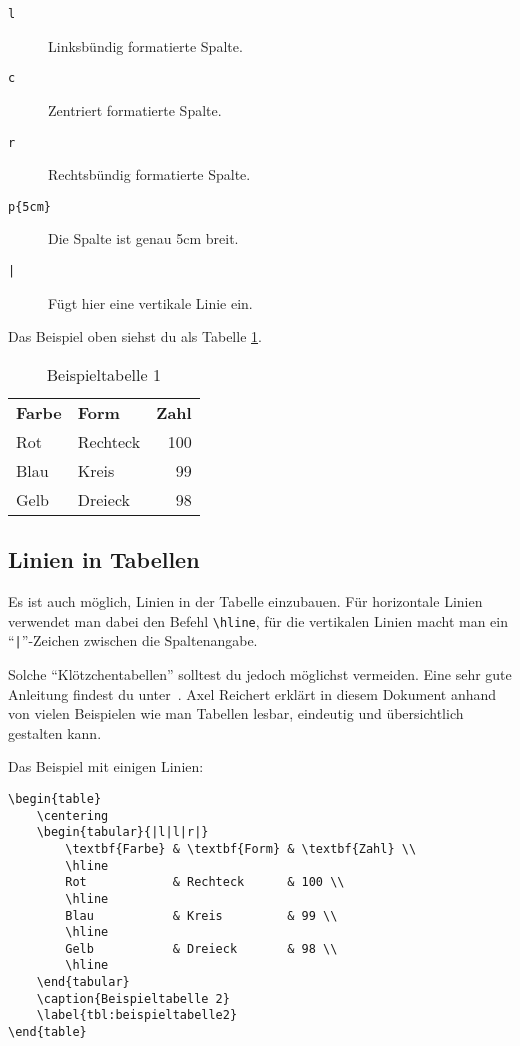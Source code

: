 \begin{description}
	\item[\texttt{l}] Linksbündig formatierte Spalte.
	\item[\texttt{c}] Zentriert formatierte Spalte.
	\item[\texttt{r}] Rechtsbündig formatierte Spalte.
	\item[\texttt{p\{5cm\}}] Die Spalte ist genau 5cm breit.
	\item[\texttt{|}] Fügt hier eine vertikale Linie ein.
\end{description}

Das Beispiel oben siehst du als Tabelle \ref{tbl:beispieltabelle1}.

\begin{table}
	\centering
	\begin{tabular}{llr}
		\textbf{Farbe} & \textbf{Form} & \textbf{Zahl} \\
		Rot            & Rechteck      & 100 \\
		Blau           & Kreis         & 99 \\
		Gelb           & Dreieck       & 98 \\
	\end{tabular}
	\caption{Beispieltabelle 1}
	\label{tbl:beispieltabelle1}
\end{table}

\subsection{Linien in Tabellen}
\label{sec:linienintabellen}

Es ist auch möglich, Linien in der Tabelle einzubauen. Für horizontale Linien verwendet man dabei den Befehl \texttt{\textbackslash hline}, für die vertikalen Linien macht man ein \enquote{\texttt{|}}-Zeichen zwischen die Spaltenangabe.

Solche \enquote{Klötzchentabellen} solltest du jedoch möglichst vermeiden. Eine sehr gute Anleitung findest du unter~\cite{TabSatz}. Axel Reichert erklärt in diesem Dokument anhand von vielen Beispielen wie man Tabellen lesbar, eindeutig und übersichtlich gestalten kann.

Das Beispiel mit einigen Linien:
\begin{lstlisting}
\begin{table}
	\centering
	\begin{tabular}{|l|l|r|}
		\textbf{Farbe} & \textbf{Form} & \textbf{Zahl} \\
		\hline
		Rot            & Rechteck      & 100 \\
		\hline
		Blau           & Kreis         & 99 \\
		\hline
		Gelb           & Dreieck       & 98 \\
		\hline
	\end{tabular}
	\caption{Beispieltabelle 2}
	\label{tbl:beispieltabelle2}
\end{table}
\end{lstlisting}

